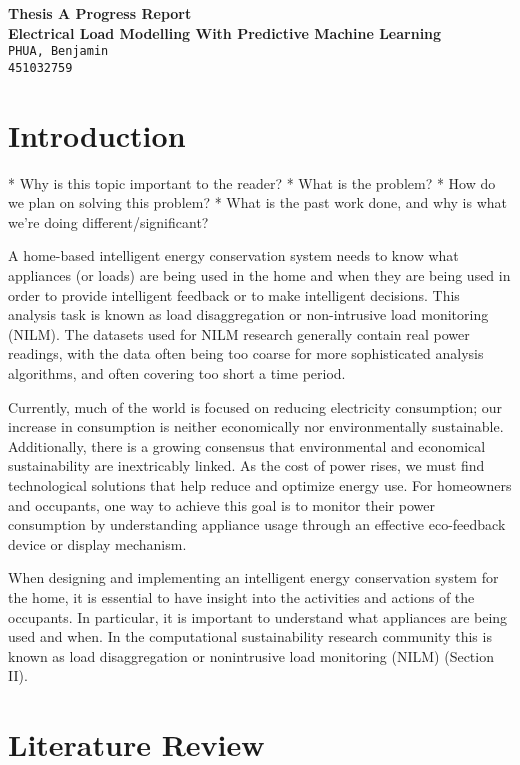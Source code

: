 \documentclass[11pt,twocolumn]{article}
\begin{document}
	\begin{center}
		\textbf{\Large Thesis A Progress Report} \\\vspace{4mm}
		\textbf{\Large Electrical Load Modelling With Predictive Machine Learning} \\\vspace{4mm}
		\texttt{PHUA, Benjamin\\451032759}
	\end{center}

	\section{Introduction}
		* Why is this topic important to the reader?
		* What is the problem?
		* How do we plan on solving this problem?
		* What is the past work done, and why is what we're doing different/significant?


		A home-based intelligent energy conservation system needs to know what appliances (or loads) are being used in the home and when they are being used in order to provide intelligent feedback or to make intelligent decisions. This analysis task is known as load disaggregation or non-intrusive load monitoring (NILM). The datasets used for NILM research generally contain real power readings, with the data often being too coarse for more sophisticated analysis algorithms, and often covering too short a time period.

		Currently, much of the world is focused on reducing electricity consumption; our increase in consumption is neither economically nor environmentally sustainable. Additionally, there is a growing consensus that environmental and economical sustainability are inextricably linked. As the cost of power rises, we must find technological solutions that help reduce and optimize energy use. For homeowners and occupants, one way to achieve this goal is to monitor their power consumption by understanding appliance usage through an effective eco-feedback device or display mechanism.

		When designing and implementing an intelligent energy conservation system for the home, it is essential to have insight into the activities and actions of the occupants. In particular, it is important to understand what appliances are being used and when. In the computational sustainability research community this is known as load disaggregation or nonintrusive load monitoring (NILM) (Section II). 


	\section{Literature Review}
\end{document}
